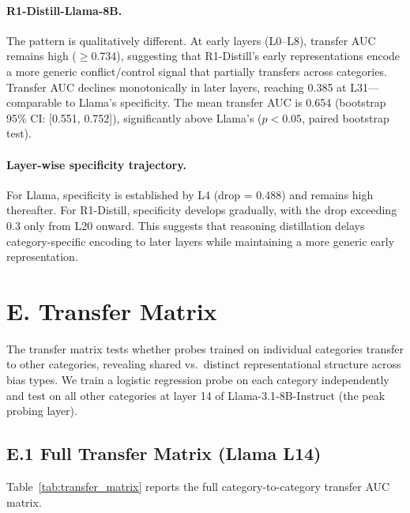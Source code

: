 \documentclass[accepted]{article}
\begin{document}
\paragraph{R1-Distill-Llama-8B.}
The pattern is qualitatively different.  At early layers (L0--L8),
transfer AUC remains high ($\geq$0.734), suggesting that R1-Distill's
early representations encode a more generic conflict/control signal
that partially transfers across categories.  Transfer AUC declines
monotonically in later layers, reaching 0.385 at L31---comparable to
Llama's specificity.  The mean transfer AUC is 0.654 (bootstrap 95\%
CI: [0.551, 0.752]), significantly above Llama's ($p < 0.05$, paired
bootstrap test).

\paragraph{Layer-wise specificity trajectory.}
For Llama, specificity is established by L4 (drop = 0.488) and
remains high thereafter.  For R1-Distill, specificity develops
gradually, with the drop exceeding 0.3 only from L20 onward.  This
suggests that reasoning distillation delays category-specific encoding
to later layers while maintaining a more generic early representation.


\section*{E. Transfer Matrix}
\label{sec:appendix_transfer}

The transfer matrix tests whether probes trained on individual
categories transfer to other categories, revealing shared vs.\
distinct representational structure across bias types.  We train a
logistic regression probe on each category independently and test on
all other categories at layer 14 of Llama-3.1-8B-Instruct (the peak
probing layer).

\subsection*{E.1 Full Transfer Matrix (Llama L14)}

Table~\ref{tab:transfer_matrix} reports the full category-to-category
transfer AUC matrix.
\end{document}
